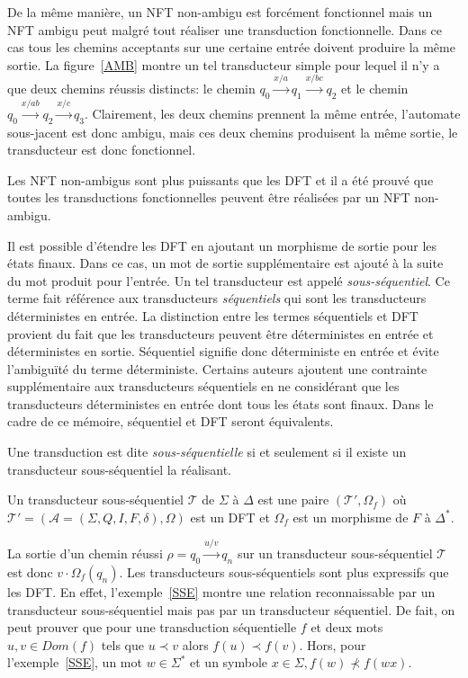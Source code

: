     De la même manière, un NFT non-ambigu est forcément fonctionnel mais un NFT ambigu peut malgré tout réaliser une transduction fonctionnelle. Dans ce cas tous les chemins acceptants sur une certaine entrée doivent produire la même sortie. La figure~\ref{AMB} montre un tel transducteur simple pour lequel il n'y a que deux chemins réussis distincts: le chemin $q_0 \xrightarrow{x/a} q_1 \xrightarrow{x/bc} q_2$ et le chemin $q_0 \xrightarrow{x/ab} q_2 \xrightarrow{x/c} q_3$. Clairement, les deux chemins prennent la même entrée, l'automate sous-jacent est donc ambigu, mais ces deux chemins produisent la même sortie, le transducteur est donc fonctionnel.
    
    Les NFT non-ambigus sont plus puissants que les DFT et il a été prouvé que toutes les transductions fonctionnelles peuvent être réalisées par un NFT non-ambigu.\cite{Em65}
    
    

	Il est possible d'étendre les DFT en ajoutant un morphisme de sortie pour les états finaux. Dans ce cas, un mot de sortie supplémentaire est ajouté à la suite du mot produit pour l'entrée. Un tel transducteur est appelé \emph{sous-séquentiel}. Ce terme fait référence aux transducteurs \emph{séquentiels} qui sont les transducteurs déterministes en entrée. La distinction entre les termes séquentiels et DFT provient du fait que les transducteurs peuvent être déterministes en entrée et déterministes en sortie. Séquentiel signifie donc déterministe en entrée et évite l'ambiguïté du terme déterministe. Certains auteurs ajoutent une contrainte supplémentaire aux transducteurs séquentiels en ne considérant que les transducteurs déterministes en entrée dont tous les états sont finaux. Dans le cadre de ce mémoire, séquentiel et DFT seront équivalents.
	
	Une transduction est dite \emph{sous-séquentielle} si et seulement si il existe un transducteur sous-séquentiel la réalisant. \\
	
	\begin{definition}
		Un transducteur sous-séquentiel $\mathscr{T}$ de $\Sigma$ à $\Delta$ est une paire $(\mathscr{T}',\Omega_f)$ où $\mathscr{T}' = (\mathscr{A} = (\Sigma, Q, I, F, \delta), \Omega)$ est un DFT et $\Omega_f$ est un morphisme de $F$ à $\Delta^*$.
	\end{definition}
	
	La sortie d'un chemin réussi $\rho = q_0 \xrightarrow{u/v} q_n$ sur un transducteur sous-séquentiel $\mathscr{T}$ est donc $v \cdot \Omega_f(q_n)$.
	Les transducteurs sous-séquentiels sont plus expressifs que les DFT. En effet, l'exemple~\ref{SSE} montre une relation reconnaissable par un transducteur sous-séquentiel mais pas par un transducteur séquentiel. De fait, on peut prouver que pour une transduction séquentielle $f$ et deux mots $u,v \in Dom(f)$ tels que $u \prec v$ alors $f(u) \prec f(v)$. Hors, pour l'exemple~\ref{SSE}, un mot $w \in \Sigma^*$ et un symbole $x \in \Sigma, f(w) \not\prec f(wx)$.
	
